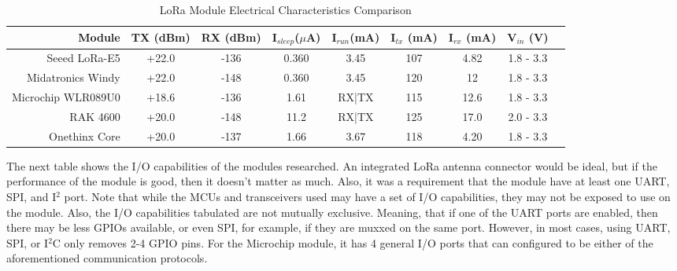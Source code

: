 \begin{table}[H]
\centering\scriptsize
\caption{LoRa Module Electrical Characteristics Comparison}
\begin{tabular}{|r|c|c|c|c|c|c|c|c|}
\hline
Module & TX (dBm) & RX (dBm) & I$_{sleep}$($\mu$A) & I$_{run}$(mA) & I$_{tx}$
(mA) & I$_{rx}$ (mA) &  V$_{in}$ (V) \\
\hline\hline

Seeed LoRa-E5       & +22.0 & -136  & 0.360   & 3.45    & 107 & 4.82  & 1.8 - 3.3 \\\hline
Midatronics Windy   & +22.0 & -148  & 0.360   & 3.45    & 120 & 12    & 1.8 - 3.3 \\\hline
Microchip WLR089U0  & +18.6 & -136  & 1.61    & RX|TX   & 115 & 12.6  & 1.8 - 3.3 \\\hline
RAK 4600            & +20.0 & -148  & 11.2    & RX|TX   & 125 & 17.0  & 2.0 - 3.3 \\\hline
Onethinx Core       & +20.0 & -137  & 1.66    & 3.67    & 118 & 4.20  & 1.8 - 3.3 \\\hline

\end{tabular}
\end{table}

The next table shows the I/O capabilities of the modules researched. An
integrated LoRa antenna connector would be ideal, but if the performance of the
module is good, then it doesn't matter as much. Also, it was a requirement that
the module have at least one UART, SPI, and I$^2$ port. Note that while the MCUs
and transceivers used may have a set of I/O capabilities, they may not be
exposed to use on the module. Also, the I/O capabilities tabulated are not
mutually exclusive. Meaning, that if one of the UART ports are enabled, then
there may be less GPIOs available, or even SPI, for example, if they are muxxed
on the same port. However, in most cases, using UART, SPI, or I$^2$C only
removes 2-4 GPIO pins. For the Microchip module, it has 4 general I/O ports that
can configured to be either of the aforementioned communication protocols.

